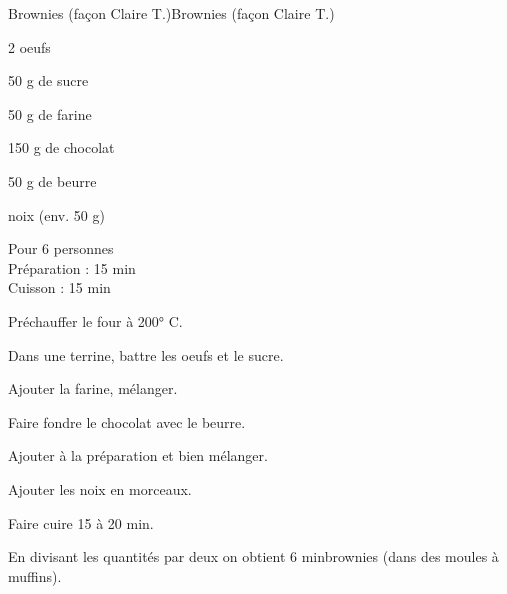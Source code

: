 \begin{recette}{Brownies (façon Claire T.)}{Brownies (façon Claire T.)}

\begin{ingredients}
2 oeufs\par
50 g de sucre\par
50 g de farine\par
150 g de chocolat\par
50 g de beurre\par
noix (env. 50 g)\par
\end{ingredients}

\begin{infos}
Pour 6 personnes\\
Préparation : 15 min\\
Cuisson : 15 min\\
\end{infos}

\begin{etapes}
\item Préchauffer le four à 200° C.
\item Dans une terrine, battre les oeufs et le sucre.
\item Ajouter la farine, mélanger.
\item Faire fondre le chocolat avec le beurre.
\item Ajouter à la préparation et bien mélanger.
\item Ajouter les noix en morceaux.
\item Faire cuire 15 à 20 min.
\end{etapes}

\begin{conseils}
En divisant les quantités par deux on obtient 6 minbrownies (dans des moules à muffins).
\end{conseils}

\end{recette}